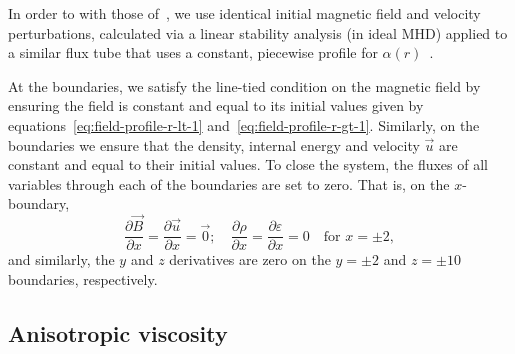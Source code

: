 In order to  with those of~\cite{hoodCoronalHeatingMagnetic2009}, we use identical initial magnetic field and velocity perturbations, calculated via a linear stability analysis (in ideal MHD) applied to a similar flux tube that uses a constant, piecewise profile for $\alpha(r)$~\cite{vanderlindenCompleteCoronalLoop1999,browningSolarCoronalHeating2003,browningHeatingCoronaNanoflares2008a}.

At the boundaries, we satisfy the line-tied condition on the magnetic field by ensuring the field is constant and equal to its initial values given by equations~\eqref{eq:field-profile-r-lt-1} and~\eqref{eq:field-profile-r-gt-1}. Similarly, on the boundaries we ensure that the density, internal energy and velocity $\vec{u}$ are constant and equal to their initial values. To close the system, the fluxes of all variables through each of the boundaries are set to zero. That is, on the $x$-boundary,
\begin{equation}
  \frac{\partial \vec{B}}{\partial x} = \frac{\partial \vec{u}}{\partial x} = \vec{0}; \quad \frac{\partial \rho}{\partial x} = \frac{\partial \varepsilon}{\partial x} = 0 \quad \text{for } x=\pm 2,
\end{equation}
and similarly, the $y$ and $z$ derivatives are zero on the $y=\pm2$ and $z=\pm10$ boundaries, respectively.

\subsection{Anisotropic viscosity}


